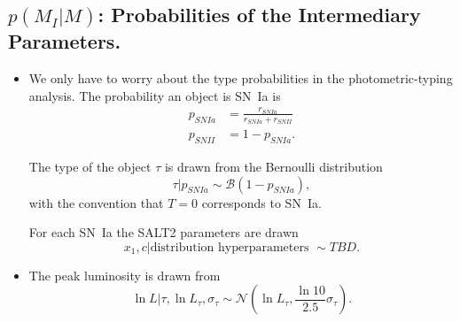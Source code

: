 \documentclass[preprint,3p]{elsarticle}
\begin{document}
\subsection{$p(M_I|M)$: Probabilities of the Intermediary Parameters.}
\begin{itemize}
\item We only have to worry about the type probabilities in the photometric-typing analysis.
The probability an object is SN~Ia is
\begin{align}
p_{SNIa} &= \frac{r_{SNIa}}{r_{SNIa}+r_{SNII}} \nonumber \\
p_{SNII}&=1-p_{SNIa}.
\label{prob:eqn}
\end{align}


The type of the object $\tau$ is drawn from the Bernoulli distribution 
\begin{equation}
\tau | p_{SNIa} \sim \mathcal{B}(1-p_{SNIa}),
\end{equation}
with the convention that $T=0$ corresponds to SN~Ia.

For each SN~Ia the SALT2 parameters are drawn
\begin{equation}
x_1, c | \text{distribution hyperparameters }  \sim TBD.
\end{equation}


\item
The peak luminosity is drawn from
\begin{equation}
\ln{L} | \tau, \ln{L}_{\tau},\sigma_{\tau} \sim \mathcal{N}\left( \ln{L}_{\tau},\frac{\ln{10}}{2.5}\sigma_{\tau}\right).
\end{equation}


\end{itemize}
\end{document}
